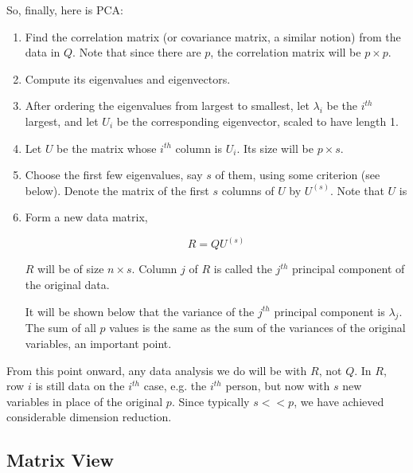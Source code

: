 So, finally, here is PCA:

\begin{enumerate}


\item Find the correlation matrix (or covariance matrix, a similar notion)
from the data in $Q$.  Note that since there are $p$, the correlation
matrix will be $p \times p$.

\item Compute its eigenvalues and eigenvectors.  

\item After ordering the eigenvalues from largest to smallest, let
$\lambda_i$ be the $i^{th}$ largest, and let $U_i$ be the corresponding
eigenvector, scaled to have length 1.  

\item Let $U$ be the matrix whose $i^{th}$ column is $U_i$.  Its size
will be $p \times s$.

\item Choose the first few eigenvalues, say $s$ of them, using some
criterion (see below).  Denote the matrix of the first $s$ columns of $U$
by $U^{(s)}$.  Note that $U$ is 

\item Form a new data matrix, 

\begin{equation}
\label{rqu}
R = Q U^{(s)}
\end{equation}

$R$ will be of size $n \times s$.  Column $j$ of $R$ is called the
$j^{th}$ principal component of the original data.  

It will be shown below that the variance of the $j^{th}$ principal
component is $\lambda_j$.  The sum of all $p$ values is the same as the
sum of the variances of the original variables, an important point.

\end{enumerate} 

From this point onward, any data analysis we do will be with $R$, not
$Q$.  In $R$, row $i$ is still data on the $i^{th}$ case, e.g. the
$i^{th}$ person, but now with $s$ new variables in place of the original
$p$.  Since typically $s << p$, we have achieved considerable dimension
reduction.

\subsection{Matrix View}


